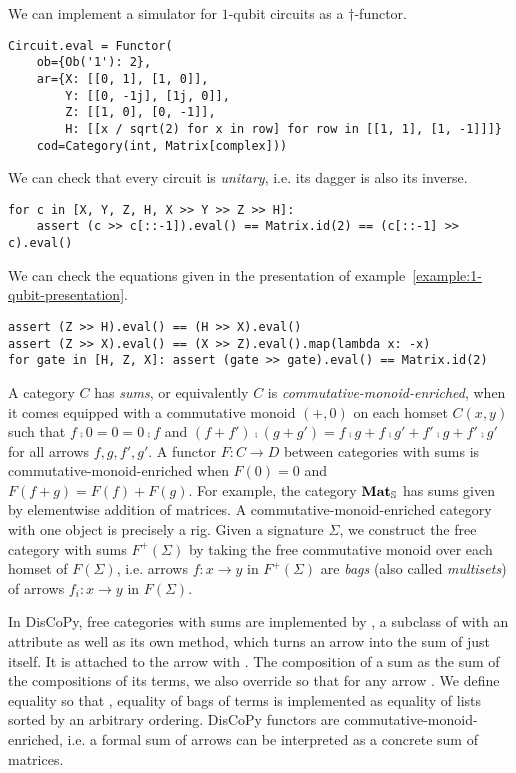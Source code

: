\begin{example}
We can implement a simulator for $1$-qubit circuits as a $\dagger$-functor.

\begin{verbatim}
Circuit.eval = Functor(
    ob={Ob('1'): 2},
    ar={X: [[0, 1], [1, 0]],
        Y: [[0, -1j], [1j, 0]],
        Z: [[1, 0], [0, -1]],
        H: [[x / sqrt(2) for x in row] for row in [[1, 1], [1, -1]]]}
    cod=Category(int, Matrix[complex]))
\end{verbatim}

We can check that every circuit is \emph{unitary}, i.e. its dagger is also its inverse.

\begin{verbatim}
for c in [X, Y, Z, H, X >> Y >> Z >> H]:
    assert (c >> c[::-1]).eval() == Matrix.id(2) == (c[::-1] >> c).eval()
\end{verbatim}

We can check the equations given in the presentation of example~\ref{example:1-qubit-presentation}.

\begin{verbatim}
assert (Z >> H).eval() == (H >> X).eval()
assert (Z >> X).eval() == (X >> Z).eval().map(lambda x: -x)
for gate in [H, Z, X]: assert (gate >> gate).eval() == Matrix.id(2)
\end{verbatim}
\end{example}

A category $C$ has \emph{sums}, or equivalently $C$ is \emph{commutative-monoid-enriched}, when it comes equipped with a commutative monoid $(+, 0)$ on each homset $C(x, y)$ such that $f \fcmp 0 = 0 = 0 \fcmp f$ and $(f + f') \fcmp (g + g') = f \fcmp g + f \fcmp g' + f' \fcmp g + f' \fcmp g'$ for all arrows $f, g, f', g'$.
A functor $F : C \to D$ between categories with sums is commutative-monoid-enriched when $F(0) = 0$ and $F(f + g) = F(f) + F(g)$.
For example, the category $\mathbf{Mat}_\S$ has sums given by elementwise addition of matrices.
A commutative-monoid-enriched category with one object is precisely a rig.
Given a signature $\Sigma$, we construct the free category with sums $F^+(\Sigma)$ by taking the free commutative monoid over each homset of $F(\Sigma)$, i.e. arrows $f : x \to y$ in $F^+(\Sigma)$ are \emph{bags} (also called \emph{multisets}) of arrows $f_i : x \to y$ in $F(\Sigma)$.

In DisCoPy, free categories with sums are implemented by , a subclass of  with an attribute  as well as its own  method, which turns an arrow into the sum of just itself.
It is attached to the arrow with .
The composition of a sum as the sum of the compositions of its terms, we also override  so that  for any arrow .
We define equality so that , equality of bags of terms is implemented as equality of lists sorted by an arbitrary ordering.
DisCoPy functors are commutative-monoid-enriched, i.e. a formal sum of arrows can be interpreted as a concrete sum of matrices.

